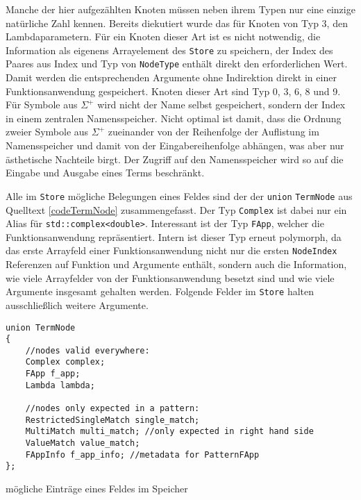 Manche der hier aufgezählten Knoten müssen neben ihrem Typen nur eine einzige natürliche Zahl kennen. Bereits diekutiert wurde das für Knoten von Typ $3$, den Lambdaparametern. Für ein Knoten dieser Art ist es nicht notwendig, die Information als eigenens Arrayelement des \verb|Store| zu speichern, der Index des Paares aus Index und Typ von \verb|NodeType| enthält direkt den erforderlichen Wert. Damit werden die entsprechenden Argumente ohne Indirektion direkt in einer Funktionsanwendung gespeichert. Knoten dieser Art sind Typ 0, 3, 6, 8 und 9. Für Symbole aus $\Sigma^+$ wird nicht der Name selbst gespeichert, sondern der Index in einem zentralen Namensspeicher. Nicht optimal ist damit, dass die Ordnung zweier Symbole aus $\Sigma^+$ zueinander von der Reihenfolge der Auflistung im Namensspeicher und damit von der Eingabereihenfolge abhängen, was aber nur ästhetische Nachteile birgt. Der Zugriff auf den Namensspeicher wird so auf die Eingabe und Ausgabe eines Terms beschränkt.


Alle im \verb|Store| mögliche Belegungen eines Feldes sind der der \verb|union| \verb|TermNode| aus Quelltext \ref{codeTermNode} zusammengefasst. Der Typ \verb|Complex| ist dabei nur ein Alias für \verb|std::complex<double>|. Interessant ist der Typ \verb|FApp|, welcher die Funktionsanwendung repräsentiert. Intern ist dieser Typ erneut polymorph, da das erste Arrayfeld einer Funktionsanwendung nicht nur die ersten \verb|NodeIndex| Referenzen auf Funktion und Argumente enthält, sondern auch die Information, wie viele Arrayfelder von der Funktionsanwendung besetzt sind und wie viele Argumente insgesamt gehalten werden. Folgende Felder im \verb|Store| halten ausschließlich weitere Argumente.


\begin{listing}
\footnotesize
\begin{verbatim}
union TermNode 
{
    //nodes valid everywhere:
    Complex complex;
    FApp f_app;
    Lambda lambda;
    
    //nodes only expected in a pattern:
    RestrictedSingleMatch single_match;
    MultiMatch multi_match; //only expected in right hand side
    ValueMatch value_match;
    FAppInfo f_app_info; //metadata for PatternFApp
};
\end{verbatim}
\label{codeTermNode}
\caption{mögliche Einträge eines Feldes im Speicher}
\end{listing}



